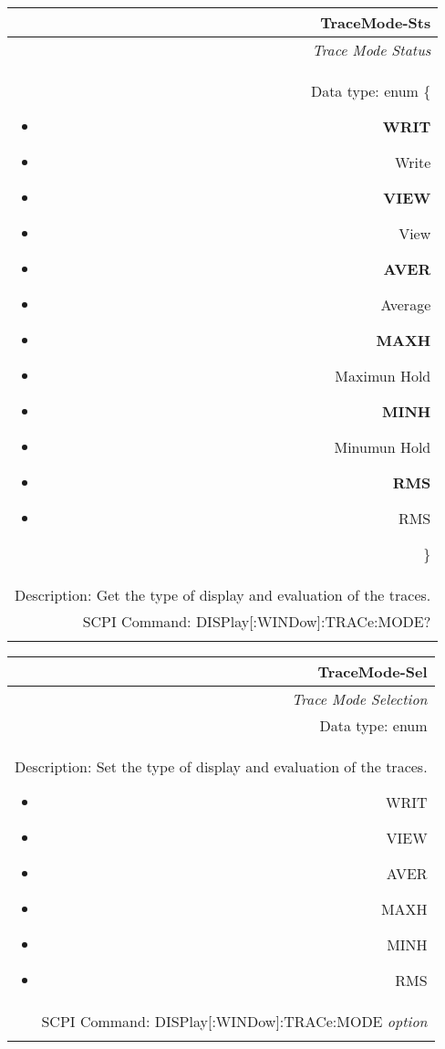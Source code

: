\documentclass[openany]{article}
\begin{document}
		\begin{tabular}{N}
			\hline
			\bfseries TraceMode-Sts \\ \hline
			\emph{Trace Mode Status} \\
			Data type: enum \{\begin{itemize}[noitemsep]
				\small
				\item[] \textbf{WRIT}
				\item[] Write
				\item[] \textbf{VIEW}
				\item[] View
				\item[] \textbf{AVER}
				\item[] Average
				\item[] \textbf{MAXH}
				\item[] Maximun Hold
				\item[] \textbf{MINH}
				\item[] Minumun Hold
				\item[] \textbf{RMS}
				\item[] RMS


			\end{itemize}\} \\
			Description: Get the type of display and evaluation of the traces. \\
			SCPI Command: DISPlay[:WINDow]:TRACe:MODE? \\
			\\ 

		\end{tabular}

		\begin{tabular}{N}
			\hline
			\bfseries TraceMode-Sel \\ \hline
			\emph{Trace Mode Selection} \\
			Data type: enum \\
			Description: Set the type of display and evaluation of the traces. \begin{itemize}[noitemsep]
				\small
				\item[] WRIT
				\item[] VIEW
				\item[] AVER
				\item[] MAXH
				\item[] MINH
				\item[] RMS
			\end{itemize} \\
			SCPI Command: DISPlay[:WINDow]:TRACe:MODE \emph{option} \\
			\\ 

		\end{tabular}
\end{document}
